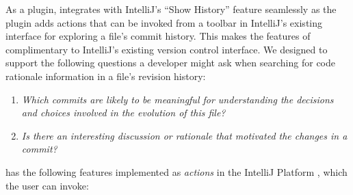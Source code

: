 As a plugin,  integrates with IntelliJ's ``Show History'' feature seamlessly as the plugin adds actions that can be invoked from a toolbar in IntelliJ's existing interface for exploring a file's commit history. 
This makes the features of  complimentary to IntelliJ's existing version control interface.
We designed  to support the following questions a developer might ask when searching for code rationale information in a file's revision history:

\begin{enumerate}[label={(\arabic*)}]
    \item \textit{Which commits are likely to be meaningful for understanding the decisions and choices involved in the evolution of this file?}
    \item \textit{Is there an interesting discussion or rationale that motivated the changes in a commit?}
\end{enumerate}

 has the following features implemented as \emph{actions} in the IntelliJ Platform , which the user can invoke:

